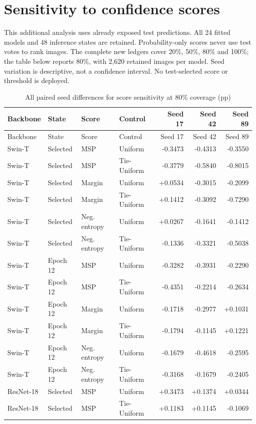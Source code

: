 \documentclass[10pt]{article}
\begin{document}
\clearpage\section{Sensitivity to confidence scores}\label{supp:scores}
This additional analysis uses already exposed test predictions. All 24 fitted models and 48 inference states are retained. Probability-only scores never use test votes to rank images. The complete new ledgers cover 20\%, 50\%, 80\% and 100\%; the table below reports 80\%, with 2,620 retained images per model. Seed variation is descriptive, not a confidence interval. No test-selected score or threshold is deployed.
\begin{longtable}{llllrrr}
\caption{All paired seed differences for score sensitivity at 80\% coverage (pp)}\label{tab:scoreseeds}\\
\toprule Backbone & State & Score & Control & Seed 17 & Seed 42 & Seed 89\\\midrule\endfirsthead
\toprule Backbone & State & Score & Control & Seed 17 & Seed 42 & Seed 89\\\midrule\endhead
Swin-T & Selected & MSP & Uniform & -0.3473 & -0.4313 & -0.3550\\
Swin-T & Selected & MSP & Tie-Uniform & -0.3779 & -0.5840 & -0.8015\\
Swin-T & Selected & Margin & Uniform & +0.0534 & -0.3015 & -0.2099\\
Swin-T & Selected & Margin & Tie-Uniform & +0.1412 & -0.3092 & -0.7290\\
Swin-T & Selected & Neg. entropy & Uniform & +0.0267 & -0.1641 & -0.1412\\
Swin-T & Selected & Neg. entropy & Tie-Uniform & -0.1336 & -0.3321 & -0.5038\\
Swin-T & Epoch 12 & MSP & Uniform & -0.3282 & -0.3931 & -0.2290\\
Swin-T & Epoch 12 & MSP & Tie-Uniform & -0.4351 & -0.2214 & -0.2634\\
Swin-T & Epoch 12 & Margin & Uniform & -0.1718 & -0.2977 & +0.1031\\
Swin-T & Epoch 12 & Margin & Tie-Uniform & -0.1794 & -0.1145 & +0.1221\\
Swin-T & Epoch 12 & Neg. entropy & Uniform & -0.1679 & -0.4618 & -0.2595\\
Swin-T & Epoch 12 & Neg. entropy & Tie-Uniform & -0.3168 & -0.1679 & -0.2405\\
ResNet-18 & Selected & MSP & Uniform & +0.3473 & +0.1374 & +0.0344\\
ResNet-18 & Selected & MSP & Tie-Uniform & +0.1183 & +0.1145 & -0.1069\\

\end{longtable}
\end{document}
